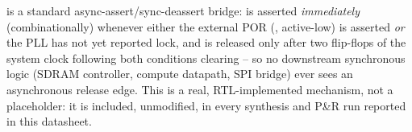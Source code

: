  is a standard async-assert/sync-deassert bridge:
 is asserted \emph{immediately} (combinationally) whenever
either the external POR (, active-low) is asserted
\emph{or} the PLL has not yet reported lock, and is released only
after two flip-flops of the system clock following both conditions
clearing -- so no downstream synchronous logic (SDRAM controller,
compute datapath, SPI bridge) ever sees an asynchronous release edge.
This is a real, RTL-implemented mechanism, not a placeholder: it is
included, unmodified, in every synthesis and P\&R run reported in this
datasheet.
